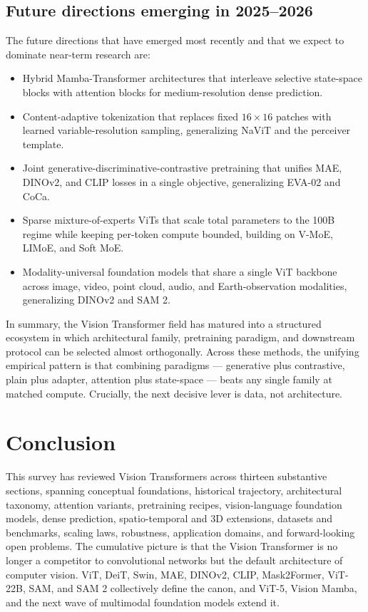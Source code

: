 \subsection{Future directions emerging in 2025--2026}\label{future-directions-emerging-in-20252026}

The future directions that have emerged most recently and that we expect to dominate near-term research are:

\begin{itemize}
\tightlist
\item
  Hybrid Mamba-Transformer architectures that interleave selective state-space blocks with attention blocks for medium-resolution dense prediction.
\item
  Content-adaptive tokenization that replaces fixed \(16 \times 16\) patches with learned variable-resolution sampling, generalizing NaViT and the perceiver template.
\item
  Joint generative-discriminative-contrastive pretraining that unifies MAE, DINOv2, and CLIP losses in a single objective, generalizing EVA-02 and CoCa.
\item
  Sparse mixture-of-experts ViTs that scale total parameters to the 100B regime while keeping per-token compute bounded, building on V-MoE, LIMoE, and Soft MoE.
\item
  Modality-universal foundation models that share a single ViT backbone across image, video, point cloud, audio, and Earth-observation modalities, generalizing DINOv2 and SAM 2.
\end{itemize}

In summary, the Vision Transformer field has matured into a structured ecosystem in which architectural family, pretraining paradigm, and downstream protocol can be selected almost orthogonally. Across these methods, the unifying empirical pattern is that combining paradigms --- generative plus contrastive, plain plus adapter, attention plus state-space --- beats any single family at matched compute. Crucially, the next decisive lever is data, not architecture.

\section{Conclusion}\label{conclusion}

This survey has reviewed Vision Transformers across thirteen substantive sections, spanning conceptual foundations, historical trajectory, architectural taxonomy, attention variants, pretraining recipes, vision-language foundation models, dense prediction, spatio-temporal and 3D extensions, datasets and benchmarks, scaling laws, robustness, application domains, and forward-looking open problems. The cumulative picture is that the Vision Transformer is no longer a competitor to convolutional networks but the default architecture of computer vision. ViT, DeiT, Swin, MAE, DINOv2, CLIP, Mask2Former, ViT-22B, SAM, and SAM 2 collectively define the canon, and ViT-5, Vision Mamba, and the next wave of multimodal foundation models extend it.

